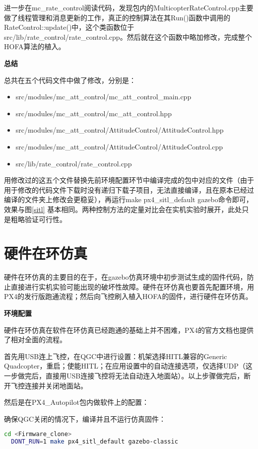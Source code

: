 进一步在mc\_rate\_control阅读代码，发现包内的MulticopterRateControl.cpp主要做了线程管理和消息更新的工作，真正的控制算法在其Run()函数中调用的RateControl::update()中，这个类函数位于src/lib/rate\_control/rate\_control.cpp。然后就在这个函数中略加修改，完成整个HOFA算法的植入。

\textbf{总结}

总共在五个代码文件中做了修改，分别是：
\begin{itemize}
  \item src/modules/mc\_att\_control/mc\_att\_control\_main.cpp
  \item src/modules/mc\_att\_control/mc\_att\_control.hpp
  \item src/modules/mc\_att\_control/AttitudeControl/AttitudeControl.hpp
  \item src/modules/mc\_att\_control/AttitudeControl/AttitudeControl.cpp
  \item src/lib/rate\_control/rate\_control.cpp
\end{itemize}

用修改过的这五个文件替换先前环境配置环节中编译完成的包中对应的文件（由于用于修改的代码文件下载时没有递归下载子项目，无法直接编译，且在原本已经过编译的文件夹上修改会更稳妥），再运行make px4\_sitl\_default gazebo命令即可，效果与图\ref{sitl} 基本相同。两种控制方法的定量对比会在实机实验时展开，此处只是粗略验证可行性。

\section{硬件在环仿真}
硬件在环仿真的主要目的在于，在gazebo仿真环境中初步测试生成的固件代码，防止直接进行实机实验可能出现的破坏性故障。硬件在环仿真也要首先配置环境，用PX4的发行版跑通流程；然后向飞控刷入植入HOFA的固件，进行硬件在环仿真。

\textbf{环境配置}

硬件在环仿真在软件在环仿真已经跑通的基础上并不困难，PX4的官方文档也提供了相对全面的流程\cite{px4hitl}。

首先用USB连上飞控，在QGC中进行设置：机架选择HITL兼容的Generic Quadcopter，重启；使能HITL；在应用设置中的自动连接选项，仅选择UDP（这一步做完后，直接用USB连接飞控将无法自动连入地面站）。以上步骤做完后，断开飞控连接并关闭地面站。

然后是在PX4\_Autopilot包内做软件上的配置\cite{px4hitl}：

确保QGC关闭的情况下，编译并且不运行仿真固件：
\begin{lstlisting}[language=Bash, basicstyle=\footnotesize, linewidth=\linewidth, breaklines=true]
  cd <Firmware_clone>
  DONT_RUN=1 make px4_sitl_default gazebo-classic
\end{lstlisting}

